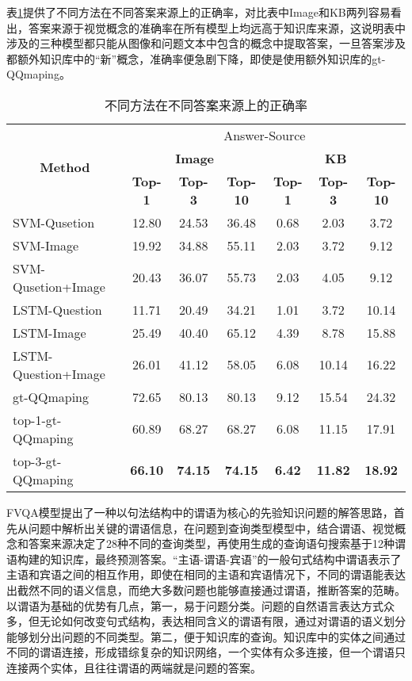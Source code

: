 表\ref{fvqa_answerSource}提供了不同方法在不同答案来源上的正确率，对比表中Image和KB两列容易看出，答案来源于视觉概念的准确率在所有模型上均远高于知识库来源，这说明表中涉及的三种模型都只能从图像和问题文本中包含的概念中提取答案，一旦答案涉及都额外知识库中的“新”概念，准确率便急剧下降，即使是使用额外知识库的gt-QQmaping。
\begin{table}[H]
\centering
\caption{不同方法在不同答案来源上的正确率}
\begin{tabular}{lcccccc}
\toprule
\multicolumn{1}{c}{\multirow{3}{*}{\textbf{Method}}} & \multicolumn{6}{c}{Answer-Source}\\
\cmidrule(r){2-7}
 & \multicolumn{3}{c}{\textbf{Image}} & \multicolumn{3}{c}{\textbf{KB}}\\
\cmidrule(r){2-4}
\cmidrule(r){5-7}
 & \textbf{Top-1} & \textbf{Top-3} & \textbf{Top-10} & \textbf{Top-1} & \textbf{Top-3} & \textbf{Top-10} \\
 \midrule
SVM-Qusetion        & 12.80 & 24.53 & 36.48 & 0.68 & 2.03 & 3.72 \\
SVM-Image           & 19.92 & 34.88 & 55.11 & 2.03 & 3.72 & 9.12 \\
SVM-Qusetion+Image  & 20.43 & 36.07 & 55.73 & 2.03 & 4.05 & 9.12 \\
LSTM-Question       & 11.71 & 20.49 & 34.21 & 1.01 & 3.72 & 10.14 \\
LSTM-Image          & 25.49 & 40.40 & 65.12 & 4.39 & 8.78 & 15.88 \\
LSTM-Question+Image & 26.01 & 41.12 & 58.05 & 6.08 & 10.14 & 16.22 \\
\midrule
\cellcolor[HTML]{C0C0C0}gt-QQmaping & \cellcolor[HTML]{C0C0C0}72.65 & \cellcolor[HTML]{C0C0C0}80.13 & \cellcolor[HTML]{C0C0C0}80.13  & \cellcolor[HTML]{C0C0C0}9.12 & \cellcolor[HTML]{C0C0C0}15.54 & \cellcolor[HTML]{C0C0C0}24.32 \\
top-1-gt-QQmaping & 60.89 & 68.27 & 68.27 & 6.08 & 11.15 & 17.91 \\ 
top-3-gt-QQmaping & \textbf{66.10} & \textbf{74.15} & \textbf{74.15} & \textbf{6.42} & \textbf{11.82} & \textbf{18.92} \\
\bottomrule
\end{tabular}
\label{fvqa_answerSource}
\end{table}

FVQA模型提出了一种以句法结构中的谓语为核心的先验知识问题的解答思路，首先从问题中解析出关键的谓语信息，在问题到查询类型模型中，结合谓语、视觉概念和答案来源决定了28种不同的查询类型，再使用生成的查询语句搜索基于12种谓语构建的知识库，最终预测答案。“主语-谓语-宾语”的一般句式结构中谓语表示了主语和宾语之间的相互作用，即使在相同的主语和宾语情况下，不同的谓语能表达出截然不同的语义信息，而绝大多数问题也能够直接通过谓语，推断答案的范畴。以谓语为基础的优势有几点，第一，易于问题分类。问题的自然语言表达方式众多，但无论如何改变句式结构，表达相同含义的谓语有限，通过对谓语的语义划分能够划分出问题的不同类型。第二，便于知识库的查询。知识库中的实体之间通过不同的谓语连接，形成错综复杂的知识网络，一个实体有众多连接，但一个谓语只连接两个实体，且往往谓语的两端就是问题的答案。

